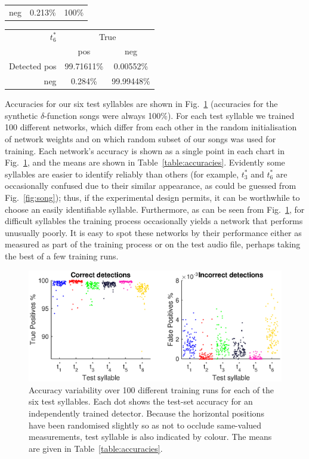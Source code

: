 \documentclass[10pt,letterpaper]{article}
\newcommand\fig[1]{Fig.~\ref{#1}}
\begin{document}
{\begin{tabular}{r|cc}
    neg & 0.213\% & 100\%\\ 
  \end{tabular}
  \vspace{8pt}\par\noindent
  \begin{tabular}{r|cc}
    $t^*_6$ & \multicolumn{2}{c}{True} \\ 
    & pos & neg \\ 
    \hline  Detected pos & 99.71611\% & 0.00552\%\\ 
    neg & 0.284\% & 99.99448\%\\ 
  \end{tabular}
  \vspace{8pt}\par\noindent
}


Accuracies for our six test syllables are shown in
\fig{fig:accuracies} (accuracies for the synthetic $\delta$-function
songs were always 100\%).  For each test syllable we trained 100
different networks, which differ from each other in the random
initialisation of network weights and on which random subset of our
songs was used for training.  Each network's accuracy is shown as a
single point in each chart in \fig{fig:accuracies}, and the means are
shown in Table~\ref{table:accuracies}.  Evidently some syllables are
easier to identify reliably than others (for example, $t^*_3$ and
$t^*_6$ are occasionally confused due to their similar appearance, as
could be guessed from \fig{fig:song}); thus, if the experimental
design permits, it can be worthwhile to choose an easily identifiable
syllable.  Furthermore, as can be seen from \fig{fig:accuracies}, for
difficult syllables the training process occasionally yields a network
that performs unusually poorly.  It is easy to spot these networks by
their performance either as measured as part of the training process
or on the test audio file, perhaps taking the best of a few training
runs.

\begin{figure}
  \includegraphics[width=\textwidth]{Fig3}
  
  \caption{Accuracy variability over 100 different training runs for
    each of the six test syllables.  Each dot shows the test-set
    accuracy for an independently trained detector.  Because the
    horizontal positions have been randomised slightly so as not to
    occlude same-valued measurements, test syllable is also indicated
    by colour.  The means are given in Table~\ref{table:accuracies}.}
  \label{fig:accuracies}
\end{figure}
\end{document}
